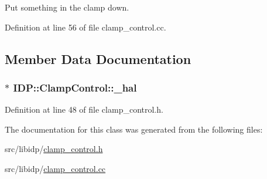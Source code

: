Put something in the clamp down. 



Definition at line 56 of file clamp\_\-control.cc.



\subsection{Member Data Documentation}
\hypertarget{classIDP_1_1ClampControl_ac0c31fdbef30bc0c0d729843c8874475}{
\subsubsection[{\_\-hal}]{$\ast$ {\bf IDP::ClampControl::\_\-hal}}}
\label{classIDP_1_1ClampControl_ac0c31fdbef30bc0c0d729843c8874475}


Definition at line 48 of file clamp\_\-control.h.



The documentation for this class was generated from the following files:\begin{DoxyCompactItemize}
\item 
src/libidp/\hyperlink{clamp__control_8h}{clamp\_\-control.h}\item 
src/libidp/\hyperlink{clamp__control_8cc}{clamp\_\-control.cc}\end{DoxyCompactItemize}
